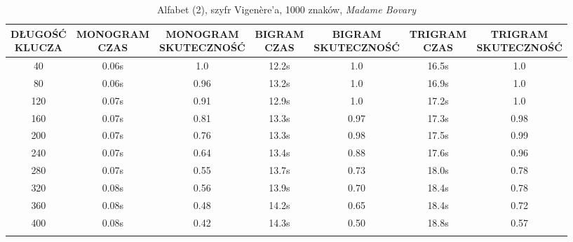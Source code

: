 \documentclass[a4paper]{article}
\theoremstyle{defn}
\theoremstyle{theorem}
\theoremstyle{lemma}
\theoremstyle{cor}
\theoremstyle{fact}
\begin{document}
\begin{center}\begin{small}\begin{longtable}{|c|c|c|c|c|c|c|} 
\hline \makecell{DŁUGOŚĆ\\KLUCZA} &  \makecell{MONOGRAM\\CZAS} & \makecell{MONOGRAM\\SKUTECZNOŚĆ} & \makecell{BIGRAM\\CZAS} &  \makecell{BIGRAM\\SKUTECZNOŚĆ} & \makecell{TRIGRAM\\CZAS} & \makecell{TRIGRAM\\SKUTECZNOŚĆ}\\ \hline 
40 & 0.06s & 1.0 & 12.2s & 1.0 & 16.5s & 1.0 \\ \hline 
80 & 0.06s & 0.96 & 13.2s & 1.0 & 16.9s & 1.0 \\ \hline 
120 & 0.07s & 0.91 & 12.9s & 1.0 & 17.2s & 1.0 \\ \hline 
160 & 0.07s & 0.81 & 13.3s & 0.97 & 17.3s & 0.98 \\ \hline 
200 & 0.07s & 0.76 & 13.3s & 0.98 & 17.5s & 0.99 \\ \hline 
240 & 0.07s & 0.64 & 13.4s & 0.88 & 17.6s & 0.96 \\ \hline 
280 & 0.07s & 0.55 & 13.7s & 0.73 & 18.0s & 0.78 \\ \hline 
320 & 0.08s & 0.56 & 13.9s & 0.70 & 18.4s & 0.78 \\ \hline 
360 & 0.08s & 0.48 & 14.2s & 0.65 & 18.4s & 0.72 \\ \hline 
400 & 0.08s & 0.42 & 14.3s & 0.50 & 18.8s & 0.57 \\ \hline 
\caption{Alfabet (2), szyfr Vigenère'a, 1000 znaków, \textit{Madame Bovary}}
\end{longtable}\end{small}\end{center} 
\end{document}
